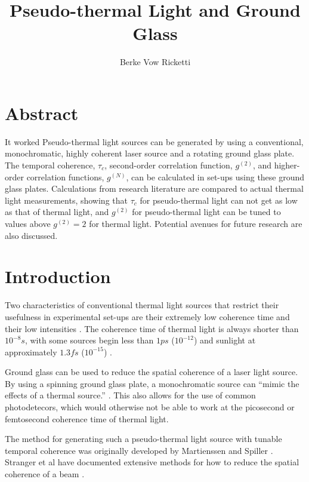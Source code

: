 \documentclass{article}
\title{Pseudo-thermal Light and Ground Glass}
\author{Berke Vow Ricketti}
\begin{document}
\maketitle{}





\section{Abstract}

It worked
Pseudo-thermal light sources can be generated by using a conventional, monochromatic, highly coherent laser source and a rotating ground glass plate. The temporal coherence, $\tau_{c}$, second-order correlation function, $g^{(2)}$, and higher-order correlation functions, $g^{(N)}$, can be calculated in set-ups using these ground glass plates. Calculations from research literature are compared to actual thermal light measurements, showing that $\tau_{c}$ for pseudo-thermal light can not get as low as that of thermal light, and $g^{(2)}$ for pseudo-thermal light can be tuned to values above $g^{(2)} = 2$ for thermal light. Potential avenues for future research are also discussed.

\section{Introduction}

Two characteristics of conventional thermal light sources that restrict their
usefulness in experimental set-ups are their extremely low coherence time and
their low intensities \cite{Spiller2014}. The coherence time of thermal light is
always shorter than $10^{-8}s$, with some sources begin less than $1 ps$ ($10^{-12}$)
and sunlight at approximately $1.3fs$ ($10^{-15}$) \cite{Spiller2014,Deutsch}.

Ground glass can be used to reduce the spatial coherence of a laser light source. By using a spinning ground glass plate, a monochromatic source can ``mimic the effects of a thermal source.'' \cite{Grider1996}. This also allows for the use of common photodetecors, which would otherwise not be able to work at the picosecond or femtosecond coherence time of thermal light.

The method for generating such a pseudo-thermal light source with tunable
temporal coherence was originally developed by Martienssen and Spiller \cite{Spiller2014}. Stranger et al have documented extensive methods for how to reduce the spatial coherence of a beam \cite{Ndersson2017}.
\end{document}
